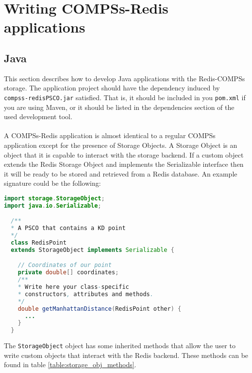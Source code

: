 \documentclass{article}
\begin{document}
\section{Writing COMPSs-Redis applications}
\subsection{Java}
This section describes how to develop Java applications with the Redis-COMPSs storage. The application project should have the dependency induced by \\ \verb|compss-redisPSCO.jar| satisfied. That is, it should be included in you \verb|pom.xml| if you are using Maven, or it should be listed in the dependencies section of the used development tool.\\
\\
A COMPSs-Redis application is almost identical to a regular COMPSs application except for the presence of Storage Objects. A Storage Object is an object that it is capable to interact with the storage backend. If a custom object extends the Redis Storage Object and implements the Serializable interface then it will be ready to be stored and retrieved from a Redis database. An example signature could be the following:
\newpage
\begin{lstlisting}[language=java]
import storage.StorageObject;
import java.io.Serializable;

  /**
  * A PSCO that contains a KD point
  */
  class RedisPoint 
  extends StorageObject implements Serializable {

    // Coordinates of our point
    private double[] coordinates;
    /**
    * Write here your class-specific
    * constructors, attributes and methods.
    */
    double getManhattanDistance(RedisPoint other) {
      ...
    }
  }
\end{lstlisting}
  The \verb|StorageObject| object has some inherited methods that allow the user to write custom objects that interact with the Redis backend. These methods can be found in table \ref{table:storage_obj_methods}.
\end{document}
